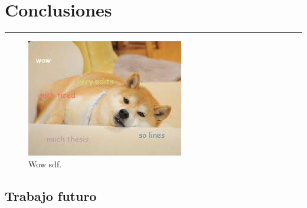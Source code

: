 \chapter{Conclusiones}\label{capit:cap5}
\vspace{-2.0325ex}%
\noindent
\rule{\textwidth}{0.5pt}
\vspace{-5.5ex}%
\newcommand{\pushline}{\Indp}%


\begin{figure}[!hbp]
\begin{center}
\includegraphics[scale=1.5]
{./Figures/doge.jpeg}
\end{center}
\caption{Wow sdf.}
\label{doge}
\end{figure}

\section{Trabajo futuro}\label{futureWork} 
\newpage

